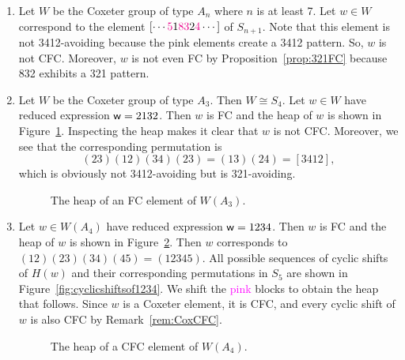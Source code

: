 \begin{example}
\begin{enumerate}[leftmargin=0.75in, label=(\alph*)]
\item Let $W$ be the Coxeter group of type $A_n$ where $n$ is at least 7. Let $w \in W$ correspond to the element $[\cdots \textcolor{magenta}{5}1\textcolor{magenta}{83}2\textcolor{magenta}{4} \cdots]$ of $S_{n+1}$.
    Note that this element is not 3412-avoiding because the pink elements create a 3412 pattern. So, $w$ is not CFC.
    Moreover, $w$ is not even FC by Proposition~\ref{prop:321FC} because 832 exhibits a 321 pattern.
	
\item Let $W$ be the Coxeter group of type $A_3$. Then $W \cong S_4$. Let $w \in W$ have reduced expression $\mathsf{w} = 2132$. Then $w$ is FC and the heap of $w$ is shown in Figure~\ref{fig:heap2132}. Inspecting the heap makes it clear that $w$ is not CFC. Moreover, we see that the corresponding permutation is $$(23)(12)(34)(23) = (13)(24) = [3412],$$ which is obviously not 3412-avoiding but is 321-avoiding.

\begin{center} \begin{figure}[H] \centering
{}
\caption{The heap of an FC element of $W(A_3)$.}\label{fig:heap2132}
\end{figure} \end{center}

\item \label{ex:cyclicshifts} Let $w \in W(A_4)$ have reduced expression $\mathsf{w} = 1234$. Then $w$ is FC and the heap of $w$ is shown in Figure~\ref{fig:heap1234}. Then $w$ corresponds to $(12)(23)(34)(45) = (12345)$.
    All possible sequences of cyclic shifts of $H(w)$ and their corresponding permutations in $S_5$ are shown in Figure~\ref{fig:cyclicshiftsof1234}. We shift the \textcolor{magenta}{pink} blocks to obtain the heap that follows. Since $w$ is a Coxeter element, it is CFC, and every cyclic shift of $w$ is also CFC by Remark~\ref{rem:CoxCFC}.
\begin{center} \begin{figure}[H] \centering
{} \caption{The heap of a CFC element of $W(A_4)$.}\label{fig:heap1234}
\end{figure} \end{center}
\end{enumerate}
\end{example}

